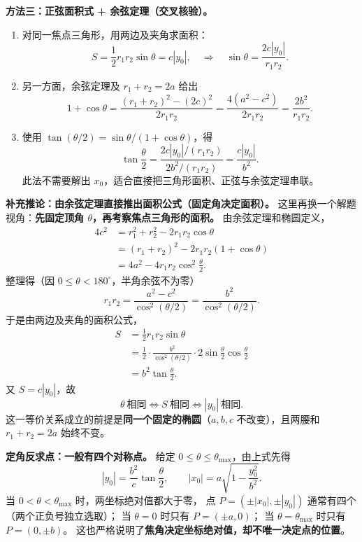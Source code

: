 \begin{proofbox}
\medskip
\textbf{方法三：正弦面积式 + 余弦定理（交叉核验）。}
\begin{enumerate}
  \item 对同一焦点三角形，用两边及夹角求面积：
  \[
  S=\frac12 r_1r_2\sin\theta=c|y_0|,
  \quad\Longrightarrow\quad
  \sin\theta=\frac{2c|y_0|}{r_1r_2}.
  \]
  \item 另一方面，余弦定理及 $r_1+r_2=2a$ 给出
  \[
  1+\cos\theta
  =\frac{(r_1+r_2)^2-(2c)^2}{2r_1r_2}
  =\frac{4(a^2-c^2)}{2r_1r_2}
  =\frac{2b^2}{r_1r_2}.
  \]
  \item 使用 $\tan(\theta/2)=\sin\theta/(1+\cos\theta)$，得
  \[
  \boxed{\tan\frac\theta2
  =\frac{2c|y_0|/(r_1r_2)}{2b^2/(r_1r_2)}
  =\frac{c|y_0|}{b^2}}.
  \]
  此法不需要解出 $x_0$，适合直接把三角形面积、正弦与余弦定理串联。
\end{enumerate}

\medskip
\textbf{补充推论：由余弦定理直接推出面积公式（固定角决定面积）。}
这里再换一个解题视角：\textbf{先固定顶角 $\theta$，再考察焦点三角形的面积。}
由余弦定理和椭圆定义，
\begin{align*}
  4c^2
  &=r_1^2+r_2^2-2r_1r_2\cos\theta\\
  &=(r_1+r_2)^2-2r_1r_2(1+\cos\theta)\\
  &=4a^2-4r_1r_2\cos^2\frac\theta2.
\end{align*}
整理得（因 $0\leq\theta<180^\circ$，半角余弦不为零）
\[
  \boxed{r_1r_2=\frac{a^2-c^2}{\cos^2(\theta/2)}
  =\frac{b^2}{\cos^2(\theta/2)}}.
\]
于是由两边及夹角的面积公式，
\begin{align*}
  S
  &=\frac12r_1r_2\sin\theta\\
  &=\frac12\cdot\frac{b^2}{\cos^2(\theta/2)}
  \cdot2\sin\frac\theta2\cos\frac\theta2\\
  &=\boxed{b^2\tan\frac\theta2}.
\end{align*}
又 $S=c|y_0|$，故
\[
  \boxed{\theta\ \text{相同}\iff S\ \text{相同}
  \iff |y_0|\ \text{相同}}.
\]
这一等价关系成立的前提是\textbf{同一个固定的椭圆}（$a,b,c$
不改变），且两腰和 $r_1+r_2=2a$ 始终不变。

\medskip
\textbf{定角反求点：一般有四个对称点。}
给定 $0\leq\theta\leq\theta_{\max}$，由上式先得
\[
  |y_0|=\frac{b^2}{c}\tan\frac\theta2,
  \qquad
  |x_0|=a\sqrt{1-\frac{y_0^2}{b^2}}.
\]
当 $0<\theta<\theta_{\max}$ 时，两坐标绝对值都大于零，
点 $P=(\pm|x_0|,\pm|y_0|)$ 通常有四个（两个正负号独立选取）；
当 $\theta=0$ 时只有 $P=(\pm a,0)$；
当 $\theta=\theta_{\max}$ 时只有 $P=(0,\pm b)$。
这也严格说明了\textbf{焦角决定坐标绝对值，却不唯一决定点的位置}。


\end{proofbox}
